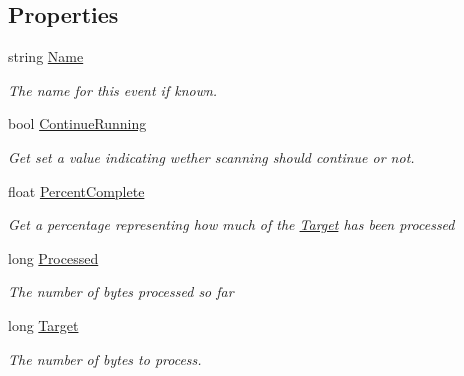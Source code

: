 \subsection*{Properties}
\begin{DoxyCompactItemize}
\item 
string \hyperlink{class_i_c_sharp_code_1_1_sharp_zip_lib_1_1_core_1_1_progress_event_args_a13354b0488b89da407521c402c974aba}{Name}
\begin{DoxyCompactList}\small\item\em The name for this event if known. \end{DoxyCompactList}\item 
bool \hyperlink{class_i_c_sharp_code_1_1_sharp_zip_lib_1_1_core_1_1_progress_event_args_ac7895a1a3adbb1d6bbbf05f20b584124}{Continue\+Running}
\begin{DoxyCompactList}\small\item\em Get set a value indicating wether scanning should continue or not. \end{DoxyCompactList}\item 
float \hyperlink{class_i_c_sharp_code_1_1_sharp_zip_lib_1_1_core_1_1_progress_event_args_a986a8a52af888c384a094c7eb49f2c58}{Percent\+Complete}
\begin{DoxyCompactList}\small\item\em Get a percentage representing how much of the \hyperlink{class_i_c_sharp_code_1_1_sharp_zip_lib_1_1_core_1_1_progress_event_args_a7f328f763763d7715320508ee6177a32}{Target} has been processed \end{DoxyCompactList}\item 
long \hyperlink{class_i_c_sharp_code_1_1_sharp_zip_lib_1_1_core_1_1_progress_event_args_a7c4956006322b63b3f3b571bf2c0a518}{Processed}
\begin{DoxyCompactList}\small\item\em The number of bytes processed so far \end{DoxyCompactList}\item 
long \hyperlink{class_i_c_sharp_code_1_1_sharp_zip_lib_1_1_core_1_1_progress_event_args_a7f328f763763d7715320508ee6177a32}{Target}
\begin{DoxyCompactList}\small\item\em The number of bytes to process. \end{DoxyCompactList}\end{DoxyCompactItemize}


